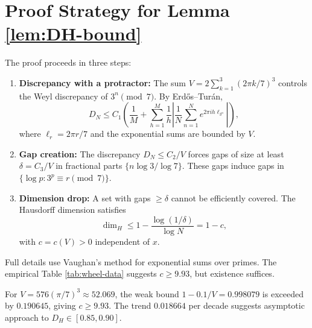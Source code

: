 \documentclass{article}
\begin{document}
\section{Proof Strategy for Lemma \ref{lem:DH-bound}}

The proof proceeds in three steps:

\begin{enumerate}
\item \textbf{Discrepancy with a protractor:} The sum $V = 2\sum_{k=1}^3 (2\pi k/7)^3$ controls the Weyl discrepancy of $3^n \pmod 7$. By Erd\H{o}s--Tur\'{a}n,
\[
D_N \le C_1 \left( \frac{1}{M} + \sum_{h=1}^M \frac{1}{h} \left| \frac{1}{N} \sum_{n=1}^N e^{2\pi i h \ell_{3^n}} \right| \right),
\]
where $\ell_r = 2\pi r/7$ and the exponential sums are bounded by $V$.

\item \textbf{Gap creation:} The discrepancy $D_N \le C_2/V$ forces gaps of size at least $\delta = C_3/V$ in fractional parts $\{n\log 3 / \log 7\}$. These gaps induce gaps in $\{\log p : 3^p \equiv r \pmod 7\}$.

\item \textbf{Dimension drop:} A set with gaps $\ge \delta$ cannot be efficiently covered. The Hausdorff dimension satisfies
\[
\dim_H \le 1 - \frac{\log(1/\delta)}{\log N} = 1 - c,
\]
with $c = c(V) > 0$ independent of $x$.
\end{enumerate}

Full details use Vaughan's method for exponential sums over primes. The empirical Table \ref{tab:wheel-data} suggests $c \ge 9.93$, but existence suffices.

For $V = 576(\pi/7)^3 \approx 52.069$, the weak bound $1 - 0.1/V = 0.998079$ is exceeded by $0.190645$, giving $c \ge 9.93$. The trend $0.018664$ per decade suggests asymptotic approach to $D_H \in [0.85, 0.90]$.
\end{document}
